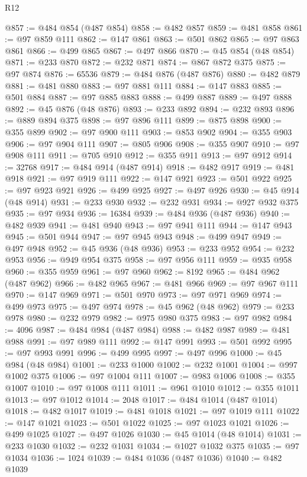 \begin{lexlean}{R12}
\begin{coremodule}
{{{{{{{{{{{{{{{{{{{{{{{{{{{{{{{{{{{{{{{{{{{{{{{{{{{{{{{{{{{{{{{{{{{{{{{{{{{{{{{{{{@857 := @484 @854 (@487 @854)
@858 := @482 @857
@859 := @481 @858
@861 := @97 @859 @111
@862 := @147 @861
@863 := @501 @862
@865 := @97 @863 @861
@866 := @499 @865
@867 := @497 @866
@870 := @45 @854 (@48 @854)
@871 := @233 @870
@872 := @232 @871
@874 := @867 @872 @375
@875 := @97 @874
@876 := 65536
@879 := @484 @876 (@487 @876)
@880 := @482 @879
@881 := @481 @880
@883 := @97 @881 @111
@884 := @147 @883
@885 := @501 @884
@887 := @97 @885 @883
@888 := @499 @887
@889 := @497 @888
@892 := @45 @876 (@48 @876)
@893 := @233 @892
@894 := @232 @893
@896 := @889 @894 @375
@898 := @97 @896 @111
@899 := @875 @898
@900 := @355 @899
@902 := @97 @900 @111
@903 := @853 @902
@904 := @355 @903
@906 := @97 @904 @111
@907 := @805 @906
@908 := @355 @907
@910 := @97 @908 @111
@911 := @705 @910
@912 := @355 @911
@913 := @97 @912
@914 := 32768
@917 := @484 @914 (@487 @914)
@918 := @482 @917
@919 := @481 @918
@921 := @97 @919 @111
@922 := @147 @921
@923 := @501 @922
@925 := @97 @923 @921
@926 := @499 @925
@927 := @497 @926
@930 := @45 @914 (@48 @914)
@931 := @233 @930
@932 := @232 @931
@934 := @927 @932 @375
@935 := @97 @934
@936 := 16384
@939 := @484 @936 (@487 @936)
@940 := @482 @939
@941 := @481 @940
@943 := @97 @941 @111
@944 := @147 @943
@945 := @501 @944
@947 := @97 @945 @943
@948 := @499 @947
@949 := @497 @948
@952 := @45 @936 (@48 @936)
@953 := @233 @952
@954 := @232 @953
@956 := @949 @954 @375
@958 := @97 @956 @111
@959 := @935 @958
@960 := @355 @959
@961 := @97 @960
@962 := 8192
@965 := @484 @962 (@487 @962)
@966 := @482 @965
@967 := @481 @966
@969 := @97 @967 @111
@970 := @147 @969
@971 := @501 @970
@973 := @97 @971 @969
@974 := @499 @973
@975 := @497 @974
@978 := @45 @962 (@48 @962)
@979 := @233 @978
@980 := @232 @979
@982 := @975 @980 @375
@983 := @97 @982
@984 := 4096
@987 := @484 @984 (@487 @984)
@988 := @482 @987
@989 := @481 @988
@991 := @97 @989 @111
@992 := @147 @991
@993 := @501 @992
@995 := @97 @993 @991
@996 := @499 @995
@997 := @497 @996
@1000 := @45 @984 (@48 @984)
@1001 := @233 @1000
@1002 := @232 @1001
@1004 := @997 @1002 @375
@1006 := @97 @1004 @111
@1007 := @983 @1006
@1008 := @355 @1007
@1010 := @97 @1008 @111
@1011 := @961 @1010
@1012 := @355 @1011
@1013 := @97 @1012
@1014 := 2048
@1017 := @484 @1014 (@487 @1014)
@1018 := @482 @1017
@1019 := @481 @1018
@1021 := @97 @1019 @111
@1022 := @147 @1021
@1023 := @501 @1022
@1025 := @97 @1023 @1021
@1026 := @499 @1025
@1027 := @497 @1026
@1030 := @45 @1014 (@48 @1014)
@1031 := @233 @1030
@1032 := @232 @1031
@1034 := @1027 @1032 @375
@1035 := @97 @1034
@1036 := 1024
@1039 := @484 @1036 (@487 @1036)
@1040 := @482 @1039
}}}}}}}}}}}}}}}}}}}}}}}}}}}}}}}}}}}}}}}}}}}}}}}}}}}}}}}}}}}}}}}}}}}}}}}}}}}}}}}}}}
\end{coremodule}
\end{lexlean}
